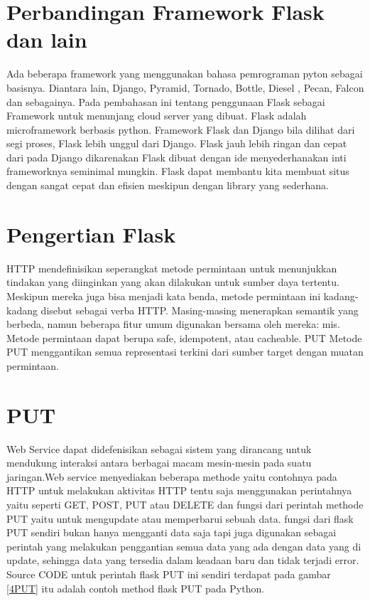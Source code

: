 \section{Perbandingan Framework Flask dan lain}
Ada beberapa framework yang menggunakan bahasa pemrograman pyton sebagai basisnya. Diantara lain, Django, Pyramid, Tornado, Bottle, Diesel , Pecan, Falcon dan sebagainya.
Pada pembahasan ini tentang penggunaan Flask sebagai Framework untuk menunjang cloud server yang dibuat. 
Flask adalah microframework berbasis python. Framework Flask dan Django bila dilihat dari segi proses, Flask lebih unggul dari Django. 
Flask jauh lebih ringan dan cepat dari pada Django dikarenakan Flask dibuat dengan ide menyederhanakan inti frameworknya seminimal mungkin. 
Flask dapat membantu kita membuat situs dengan sangat cepat dan efisien meskipun dengan library yang sederhana.

\section{Pengertian Flask}
HTTP mendefinisikan seperangkat metode permintaan untuk menunjukkan tindakan yang diinginkan yang akan dilakukan untuk sumber daya tertentu. Meskipun mereka juga bisa menjadi kata benda, metode permintaan ini kadang-kadang disebut sebagai verba HTTP. Masing-masing menerapkan semantik yang berbeda, namun beberapa fitur umum digunakan bersama oleh mereka: mis. Metode permintaan dapat berupa safe, idempotent, atau cacheable.
PUT
Metode PUT menggantikan semua representasi terkini dari sumber target dengan muatan permintaan.

\section{PUT}
Web Service dapat didefenisikan sebagai sistem yang dirancang untuk mendukung interaksi antara berbagai macam mesin-mesin pada suatu jaringan.Web service menyediakan beberapa methode yaitu contohnya pada  HTTP untuk melakukan aktivitas HTTP tentu saja menggunakan perintahnya yaitu seperti  GET, POST, PUT atau DELETE dan fungsi dari perintah methode PUT yaitu untuk mengupdate atau memperbarui sebuah data.
fungsi dari flask PUT sendiri bukan hanya mengganti data saja tapi
juga digunakan sebagai perintah yang melakukan
penggantian semua data yang ada dengan data yang di update, sehingga
data yang tersedia dalam keadaan baru dan tidak terjadi error.
Source CODE untuk perintah flask PUT ini sendiri terdapat pada gambar \ref{4PUT} 
itu adalah contoh method flask PUT pada Python.

